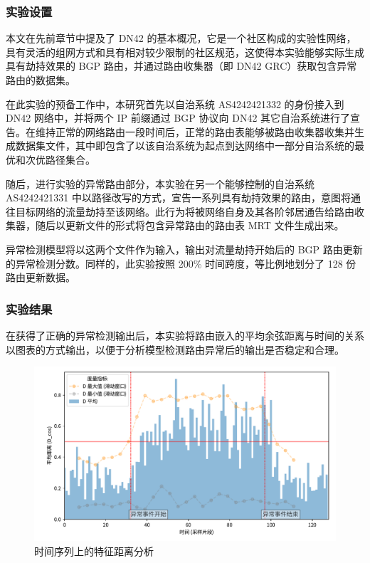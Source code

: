 \subsubsection{实验设置}

本文在先前章节中提及了 DN42 的基本概况，它是一个社区构成的实验性网络，具有灵活的组网方式和具有相对较少限制的社区规范，这使得本实验能够实际生成具有劫持效果的 BGP 路由，并通过路由收集器（即 DN42 GRC）获取包含异常路由的数据集。

在此实验的预备工作中，本研究首先以自治系统 AS4242421332 的身份接入到 DN42 网络中，并将两个 IP 前缀通过 BGP 协议向 DN42 其它自治系统进行了宣告。在维持正常的网络路由一段时间后，正常的路由表能够被路由收集器收集并生成数据集文件，其中即包含了以该自治系统为起点到达网络中一部分自治系统的最优和次优路径集合。

随后，进行实验的异常路由部分，本实验在另一个能够控制的自治系统 AS4242421331 中以路径改写的方式，宣告一系列具有劫持效果的路由，意图将通往目标网络的流量劫持至该网络。此行为将被网络自身及其各阶邻居通告给路由收集器，随后以更新文件的形式将包含异常路由的路由表 MRT 文件生成出来。

异常检测模型将以这两个文件作为输入，输出对流量劫持开始后的 BGP 路由更新的异常检测分数。同样的，此实验按照 200\% 时间跨度，等比例地划分了 128 份路由更新数据。

\subsubsection{实验结果}

在获得了正确的异常检测输出后，本实验将路由嵌入的平均余弦距离与时间的关系以图表的方式输出，以便于分析模型检测路由异常后的输出是否稳定和合理。

\begin{figure}[h]
    \includegraphics[width=\linewidth]{chapter/c5_images/c5_route-distance.pdf}
    \caption{时间序列上的特征距离分析}
    \label{c5_route-distance}
\end{figure}

